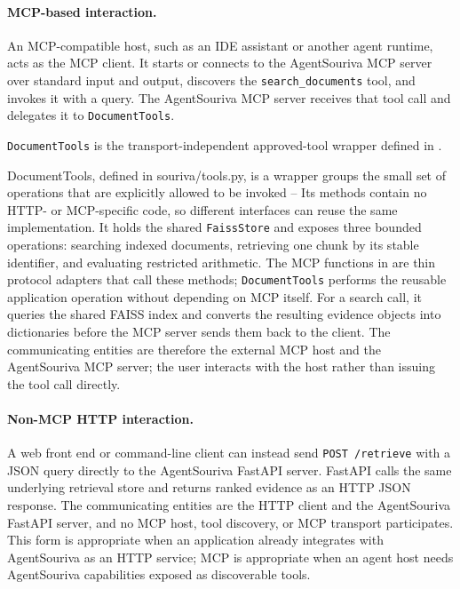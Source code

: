 \paragraph{MCP-based interaction.}
An MCP-compatible host, such as an IDE assistant or another agent runtime, acts as the MCP client. It starts or connects to the AgentSouriva MCP server over standard input and output, discovers the \texttt{search\_documents} tool, and invokes it with a query. The AgentSouriva MCP server receives that tool call and delegates it to \texttt{DocumentTools}.


\texttt{DocumentTools} is the transport-independent approved-tool wrapper defined in .

DocumentTools, defined in souriva/tools.py, is a wrapper groups the small set of operations that are explicitly allowed to be invoked -- Its methods contain no HTTP- or MCP-specific code, so different interfaces can reuse the same implementation. It holds the shared \texttt{FaissStore} and exposes three bounded operations: searching indexed documents, retrieving one chunk by its stable identifier, and evaluating restricted arithmetic. The MCP functions in  are thin protocol adapters that call these methods; \texttt{DocumentTools} performs the reusable application operation without depending on MCP itself. For a search call, it queries the shared FAISS index and converts the resulting evidence objects into dictionaries before the MCP server sends them back to the client. The communicating entities are therefore the external MCP host and the AgentSouriva MCP server; the user interacts with the host rather than issuing the tool call directly.

\paragraph{Non-MCP HTTP interaction.}
A web front end or command-line client can instead send \texttt{POST\ /retrieve} with a JSON query directly to the AgentSouriva FastAPI server. FastAPI calls the same underlying retrieval store and returns ranked evidence as an HTTP JSON response. The communicating entities are the HTTP client and the AgentSouriva FastAPI server, and no MCP host, tool discovery, or MCP transport participates. This form is appropriate when an application already integrates with AgentSouriva as an HTTP service; MCP is appropriate when an agent host needs AgentSouriva capabilities exposed as discoverable tools.

